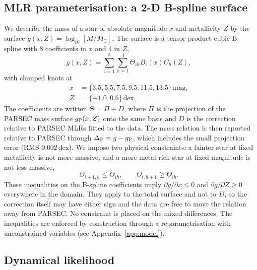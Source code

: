 \documentclass{aa}
\newcommand{\msun}{M_{\odot}}
\begin{document}
\subsection{MLR parameterisation: a 2-D B-spline surface}\label{sec:mlr}
We describe the mass of a star of absolute magnitude $x$ and metallicity $Z$ by the surface $g(x,Z)=\log_{10}[M/\msun]$. The surface is a tensor-product cubic B-spline \citep{deBoor2001Splines} with $8$ coefficients in $x$ and $4$ in $Z$,
\begin{equation}
 g(x,Z)=\sum_{i=1}^{8}\sum_{h=1}^{4}\Theta_{ih}B_i(x)C_h(Z),
 \label{eq:g-total}
\end{equation}
with clamped knots at
\begin{align}
 x&=\{3.5,5.5,7.5,9.5,11.5,13.5\}\,\mathrm{mag},\\
 Z&=\{-1.0,0.6\}\,\mathrm{dex}.
 \label{eq:knots}
\end{align}
The coefficients are written $\Theta=\Pi+D$, where $\Pi$ is the projection of the PARSEC mass surface $g_{\rm P}(x,Z)$ onto the same basis and $D$ is the correction relative to PARSEC MLRs fitted to the data. The mass relation is then reported relative to PARSEC through $\Delta_{\rm P}=g-g_{\rm P}$, which includes the small projection error (RMS $0.002$\,dex). We impose two physical constraints: a fainter star at fixed metallicity is not more massive, and a more metal-rich star at fixed magnitude is not less massive,
\begin{equation}
 \Theta_{i+1,h}\le\Theta_{ih},\qquad \Theta_{i,h+1}\ge\Theta_{ih}.
 \label{eq:coefficient-order}
\end{equation}
These inequalities on the B-spline coefficients imply $\partial g/\partial x\le0$ and $\partial g/\partial Z\ge0$ everywhere in the domain. They apply to the total surface and not to $D$, so the correction itself may have either sign and the data are free to move the relation away from PARSEC. No constraint is placed on the mixed differences. The inequalities are enforced by construction through a reparametrisation with unconstrained variables (see Appendix~\ref{app:model}).

\subsection{Dynamical likelihood}\label{sec:dynamics}
\end{document}
